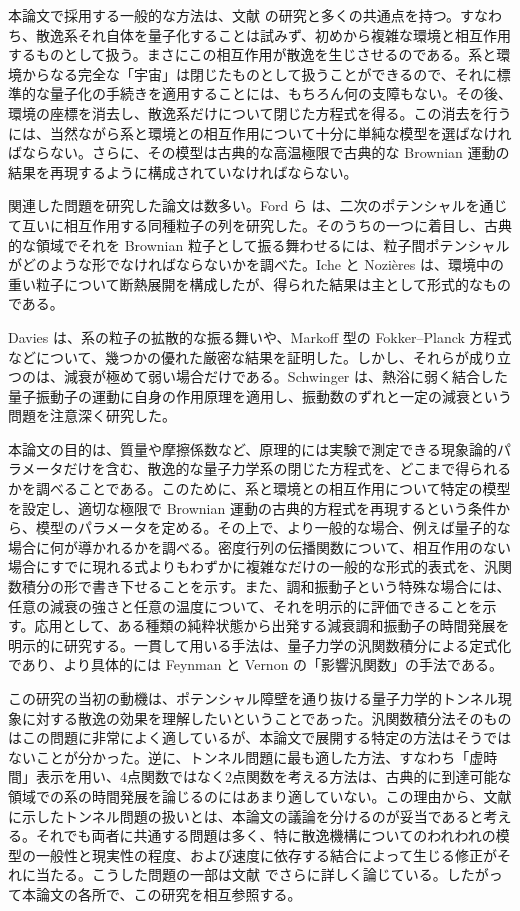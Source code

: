 本論文で採用する一般的な方法は、文献 \cite{ref08,ref09,ref10,ref11,ref12,ref13} の研究と多くの共通点を持つ。すなわち、散逸系それ自体を量子化することは試みず、初めから複雑な環境と相互作用するものとして扱う。まさにこの相互作用が散逸を生じさせるのである。系と環境からなる完全な「宇宙」は閉じたものとして扱うことができるので、それに標準的な量子化の手続きを適用することには、もちろん何の支障もない。その後、環境の座標を消去し、散逸系だけについて閉じた方程式を得る。この消去を行うには、当然ながら系と環境との相互作用について十分に単純な模型を選ばなければならない。さらに、その模型は古典的な高温極限で古典的な Brownian 運動の結果を再現するように構成されていなければならない。

関連した問題を研究した論文は数多い。Ford ら\cite{ref16} は、二次のポテンシャルを通じて互いに相互作用する同種粒子の列を研究した。そのうちの一つに着目し、古典的な領域でそれを Brownian 粒子として振る舞わせるには、粒子間ポテンシャルがどのような形でなければならないかを調べた。Iche と Nozières\cite{ref17} は、環境中の重い粒子について断熱展開を構成したが、得られた結果は主として形式的なものである。

Davies\cite{ref18} は、系の粒子の拡散的な振る舞いや、Markoff 型の Fokker--Planck 方程式などについて、幾つかの優れた厳密な結果を証明した。しかし、それらが成り立つのは、減衰が極めて弱い場合だけである。Schwinger\cite{ref19} は、熱浴に弱く結合した量子振動子の運動に自身の作用原理を適用し、振動数のずれと一定の減衰という問題を注意深く研究した。

本論文の目的は、質量や摩擦係数など、原理的には実験で測定できる現象論的パラメータだけを含む、散逸的な量子力学系の閉じた方程式を、どこまで得られるかを調べることである。このために、系と環境との相互作用について特定の模型を設定し、適切な極限で Brownian 運動の古典的方程式を再現するという条件から、模型のパラメータを定める\cite{ref20}。その上で、より一般的な場合、例えば量子的な場合に何が導かれるかを調べる。密度行列の伝播関数について、相互作用のない場合にすでに現れる式よりもわずかに複雑なだけの一般的な形式的表式を、汎関数積分の形で書き下せることを示す。また、調和振動子という特殊な場合には、任意の減衰の強さと任意の温度について、それを明示的に評価できることを示す。応用として、ある種類の純粋状態から出発する減衰調和振動子の時間発展を明示的に研究する。一貫して用いる手法は、量子力学の汎関数積分による定式化であり、より具体的には Feynman と Vernon の「影響汎関数」の手法である。

この研究の当初の動機は、ポテンシャル障壁を通り抜ける量子力学的トンネル現象に対する散逸の効果を理解したいということであった。汎関数積分法そのものはこの問題に非常によく適しているが、本論文で展開する特定の方法はそうではないことが分かった。逆に、トンネル問題に最も適した方法、すなわち「虚時間」表示を用い、4点関数ではなく2点関数を考える方法は、古典的に到達可能な領域での系の時間発展を論じるのにはあまり適していない。この理由から、文献 \cite{ref21} に示したトンネル問題の扱いとは、本論文の議論を分けるのが妥当であると考える。それでも両者に共通する問題は多く、特に散逸機構についてのわれわれの模型の一般性と現実性の程度、および速度に依存する結合によって生じる修正がそれに当たる。こうした問題の一部は文献 \cite{ref21} でさらに詳しく論じている。したがって本論文の各所で、この研究を相互参照する。

